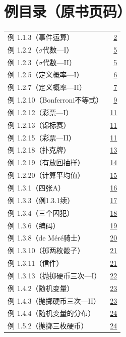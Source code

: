 \clearpage{}
\section*{例目录（原书页码）}\label{front:examples}
\begin{longtable}{@{}p{}r@{}}
例 1.1.3（事件运算） & \hyperref[ex:1.1.3]{2} \\
例 1.2.2（$\sigma$代数—I） & \hyperref[ex:1.2.2]{5} \\
例 1.2.3（$\sigma$代数—II） & \hyperref[ex:1.2.3]{5} \\
例 1.2.5（定义概率—I） & \hyperref[ex:1.2.5]{6} \\
例 1.2.7（定义概率—II） & \hyperref[ex:1.2.7]{7} \\
例 1.2.10（Bonferroni不等式） & \hyperref[ex:1.2.10]{9} \\
例 1.2.12（彩票—I） & \hyperref[ex:1.2.12]{11} \\
例 1.2.13（锦标赛） & \hyperref[ex:1.2.13]{11} \\
例 1.2.15（彩票—II） & \hyperref[ex:1.2.15]{11} \\
例 1.2.18（扑克牌） & \hyperref[ex:1.2.18]{13} \\
例 1.2.19（有放回抽样） & \hyperref[ex:1.2.19]{14} \\
例 1.2.20（计算平均值） & \hyperref[ex:1.2.20]{15} \\
例 1.3.1（四张A） & \hyperref[ex:1.3.1]{16} \\
例 1.3.3（例1.3.1续） & \hyperref[ex:1.3.3]{17} \\
例 1.3.4（三个囚犯） & \hyperref[ex:1.3.4]{18} \\
例 1.3.6（编码） & \hyperref[ex:1.3.6]{19} \\
例 1.3.8（de Méré骑士） & \hyperref[ex:1.3.8]{20} \\
例 1.3.10（掷两枚骰子） & \hyperref[ex:1.3.10]{21} \\
例 1.3.11（信件） & \hyperref[ex:1.3.11]{21} \\
例 1.3.13（抛掷硬币三次—I） & \hyperref[ex:1.3.13]{22} \\
例 1.4.2（随机变量） & \hyperref[ex:1.4.2]{23} \\
例 1.4.3（抛掷硬币三次—II） & \hyperref[ex:1.4.3]{23} \\
例 1.4.4（随机变量的分布） & \hyperref[ex:1.4.4]{24} \\
例 1.5.2（抛掷三枚硬币） & \hyperref[ex:1.5.2]{24} \\

\end{longtable}
